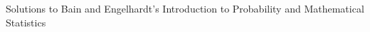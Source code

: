 \topmargin-1cm
\textwidth17cm
\thispagestyle{empty}
\parindent0cm
\begin{center}
{\Large Solutions to Bain and Engelhardt's Introduction to Probability and Mathematical Statistics}
\end{center}
\bigskip



















